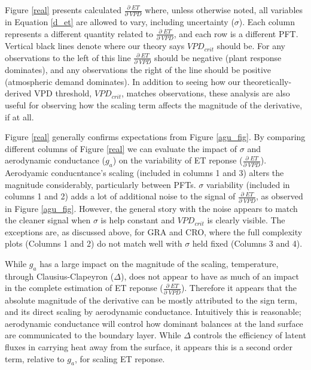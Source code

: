 \documentclass[draft,linenumbers]{agujournal}
\begin{document}
Figure \ref{real} presents calculated $\frac{\partial \; ET}{\partial \; VPD}$ where, unless otherwise noted, all variables in Equation \ref{d_et} are allowed to vary, including uncertainty ($\sigma$). Each column represents a different quantity related to $\frac{\partial \; ET}{\partial \; VPD}$, and each row is a different PFT. Vertical black lines denote where our theory says $VPD_{crit}$ should be. For any observations to the left of this line $\frac{\partial \; ET}{\partial \; VPD}$ should be negative (plant response dominates), and any observations the right of the line should be positive (atmospheric demand dominates). In addition to seeing how our theoretically-derived VPD threshold, $VPD_{crit}$, matches observations, these analysis are also useful for observing how the scaling term affects the magnitude of the derivative, if at all. 

Figure \ref{real} generally confirms expectations from Figure \ref{agu_fig}. By comparing different columns of Figure \ref{real} we can evaluate the impact of $\sigma$ and aerodynamic conductance ($g_a$) on the variability of ET reponse ($\frac{\partial \; ET}{\partial \; VPD}$). Aerodyamic conducntance's scaling (included in columns 1 and 3) alters the magnitude considerably, particularly between PFTs. $\sigma$ variability (included in columns 1 and 2) adds a lot of additional noise to the signal of $\frac{\partial \; ET}{\partial \; VPD}$, as observed in Figure \ref{agu_fig}. However, the general story with the noise appears to match the cleaner signal when $\sigma$ is help constant and $VPD_{crit}$ is clearly visible. The exceptions are, as discussed above, for GRA and CRO, where the full complexity plots (Columns 1 and 2) do not match well with $\sigma$ held fixed (Columns 3 and 4).

While $g_a$ has a large impact on the magnitude of the scaling, temperature, through Clausius-Clapeyron ($\Delta$), does not appear to have as much of an impact in the complete estimation of ET reponse ($\frac{\partial \; ET}{\partial \; VPD}$). Therefore it appears that the absolute magnitude of the derivative can be mostly attributed to the sign term, and its direct scaling by aerodynamic conductance. Intuitively this is reasonable; aerodynamic conductance will control how dominant balances at the land surface are communicated to the boundary layer. While $\Delta$ controls the efficiency of latent fluxes in carrying heat away from the surface, it appears this is a second order term, relative to $g_a$, for scaling ET reponse. 
\end{document}
